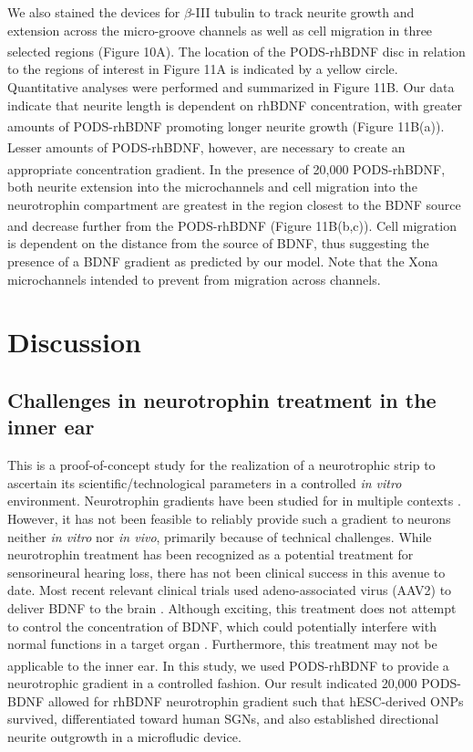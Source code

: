 \documentclass[review]{elsarticle}
\begin{document}
We also stained the devices for $\beta$-III tubulin to track neurite growth and extension across the micro-groove channels as well as cell migration in three selected regions (Figure 10A). The location of the PODS\textsuperscript{\textregistered}-rhBDNF disc in relation to the regions of interest in Figure 11A is indicated by a yellow circle. Quantitative analyses were performed and summarized in Figure 11B. Our data indicate that neurite length is dependent on rhBDNF concentration, with greater amounts of PODS\textsuperscript{\textregistered}-rhBDNF promoting longer neurite growth (Figure 11B(a)). Lesser amounts of PODS\textsuperscript{\textregistered}-rhBDNF, however, are necessary to create an appropriate concentration gradient. In the presence of 20,000 PODS\textsuperscript{\textregistered}-rhBDNF, both neurite extension into the microchannels and cell migration into the neurotrophin compartment are greatest in the region closest to the BDNF source and decrease further from the PODS\textsuperscript{\textregistered}-rhBDNF (Figure 11B(b,c)). Cell migration is dependent on the distance from the source of BDNF, thus suggesting the presence of a BDNF gradient as predicted by our model. Note that the Xona microchannels intended to prevent from migration across channels. 


\section {Discussion}%
\subsection{Challenges in neurotrophin treatment in the inner ear}  
This is a proof-of-concept study for the realization of a neurotrophic strip to ascertain its scientific/technological parameters in a controlled \textit{in vitro} environment. Neurotrophin gradients have been studied for in multiple contexts \cite{Keefe2017,Awad2015,Hollis2011}. However, it has not been feasible to reliably provide such a gradient to neurons neither \textit{in vitro} nor \textit{in vivo}, primarily because of technical challenges. While neurotrophin treatment has been recognized as a potential treatment for sensorineural hearing loss, there has not been clinical success in this avenue to date. Most recent relevant clinical trials used adeno-associated virus (AAV2) to deliver BDNF to the brain \cite{Nagahara2018}. Although exciting, this treatment does not attempt to control the concentration of BDNF, which could potentially interfere with normal functions in a target organ \cite{Croll1999}. Furthermore, this treatment may not be applicable to the inner ear. In this study, we used PODS\textsuperscript{\textregistered}-rhBDNF to provide a neurotrophic gradient in a controlled fashion. Our result indicated 20,000 PODS-BDNF allowed for rhBDNF neurotrophin gradient such that hESC-derived ONPs survived, differentiated toward human SGNs, and also established directional neurite outgrowth in a microfludic device. 
\end{document}
